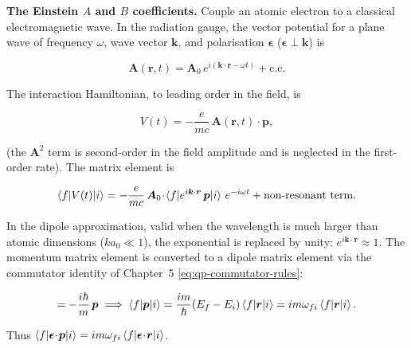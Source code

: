 \medskip\noindent\textbf{The Einstein $A$ and $B$ coefficients.}
Couple an atomic electron to a classical electromagnetic wave. In the radiation gauge, the vector potential for a plane wave of frequency $\omega$, wave vector $\bm k$, and polarisation $\bm\epsilon$ ($\bm\epsilon\perp\bm k$) is
\begin{linenomath}
\begin{equation*}
\bm A(\bm r,t) = \bm A_{0}\,e^{i(\bm k\cdot\bm r - \omega t)} + \text{c.c.}
\end{equation*}
\end{linenomath}
The interaction Hamiltonian, to leading order in the field, is
\begin{linenomath}
\begin{equation*}
V(t) = -\frac{e}{mc}\,\bm A(\bm r,t)\!\cdot\!\bm p,
\end{equation*}
\end{linenomath}
(the $\bm A^{2}$ term is second-order in the field amplitude and is neglected in the first-order rate). The matrix element is
\begin{linenomath}
\begin{equation*}
\braket{f|V(t)|i} = -\frac{e}{mc}\,\bm A_{0}\!\cdot\!\braket{f|e^{i\bm k\cdot\bm r}\,\bm p|i}\,e^{-i\omega t} + \text{non-resonant term}.
\end{equation*}
\end{linenomath}
In the dipole approximation, valid when the wavelength is much larger than atomic dimensions ($ka_{0} \ll 1$), the exponential is replaced by unity: $e^{i\bm k\cdot\bm r} \approx 1$. The momentum matrix element is converted to a dipole matrix element via the commutator identity of Chapter~5 \eqref{eq:qp-commutator-rules}:
\begin{linenomath}
\begin{equation}
[H_{0},\bm r] = -\frac{i\hbar}{m}\,\bm p
\;\Longrightarrow\;
\braket{f|\bm p|i} = \frac{im}{\hbar}(E_{f}-E_{i})\braket{f|\bm r|i} = im\omega_{fi}\braket{f|\bm r|i}.
\label{eq:dipole-matrix-element}
\end{equation}
\end{linenomath}
Thus $\braket{f|\bm\epsilon\!\cdot\!\bm p|i} = im\omega_{fi}\braket{f|\bm\epsilon\!\cdot\!\bm r|i}$.

